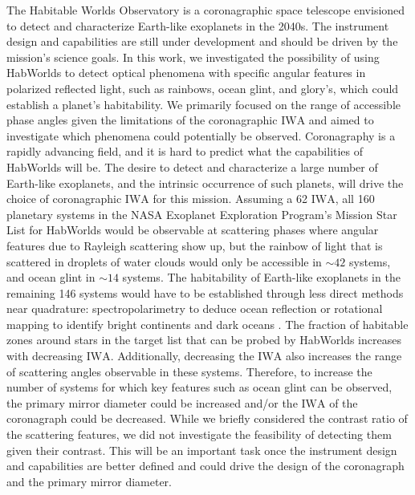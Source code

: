 \documentclass[usenatbib]{mnras}
\newcommand{\IWA}{\ensuremath{\mathrm{IWA}}\xspace}
\newcommand{\HWO}{HabWorlds\xspace}
\begin{document}
The Habitable Worlds Observatory is a coronagraphic space telescope envisioned to detect and characterize Earth-like exoplanets in the 2040s. 
The instrument design and capabilities are still under development and should be driven by the mission's science goals.
In this work, we investigated the possibility of using \HWO to detect optical phenomena with specific angular features in polarized reflected light, such as rainbows, ocean glint, and glory's, which could establish a planet's habitability. 
We primarily focused on the range of accessible phase angles given the limitations of the coronagraphic \IWA and aimed to investigate which phenomena could potentially be observed.
Coronagraphy is a rapidly advancing field, and it is hard to predict what the capabilities of \HWO will be.
The desire to detect and characterize a large number of Earth-like exoplanets, and the intrinsic occurrence of such planets, will drive the choice of coronagraphic \IWA for this mission.
Assuming a \qty{62}{\mas} \IWA, all \num{160} planetary systems in the NASA Exoplanet Exploration Program's Mission Star List for \HWO would be observable at scattering phases where angular features due to Rayleigh scattering show up, but the rainbow of light that is scattered in droplets of water clouds would only be accessible in $\sim\num{42}$ systems, and ocean glint in $\sim\num{14}$ systems.
The habitability of Earth-like exoplanets in the remaining 146 systems would have to be established through less direct methods near quadrature: spectropolarimetry to deduce ocean reflection \citep{trees2022} or rotational mapping to identify bright continents and dark oceans \citep[e.g.,][]{2009ApJ...700..915C,lustig2019}.   
The fraction of habitable zones around stars in the target list that can be probed by \HWO increases with decreasing \IWA. 
Additionally, decreasing the \IWA also increases the range of scattering angles observable in these systems. 
Therefore, to increase the number of systems for which key features such as ocean glint can be observed, the primary mirror diameter could be increased and/or the \IWA of the coronagraph could be decreased.
While we briefly considered the contrast ratio of the scattering features, we did not investigate the feasibility of detecting them given their contrast. 
This will be an important task once the instrument design and capabilities are better defined and could drive the design of the coronagraph and the primary mirror diameter. 
\end{document}
